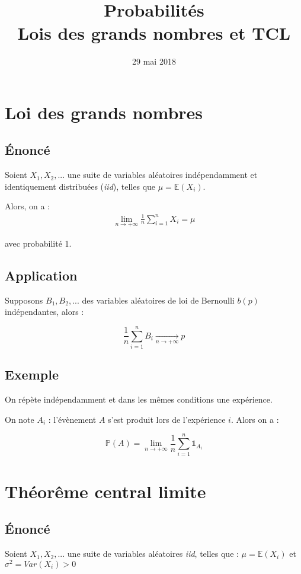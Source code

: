 \documentclass{article}
\title{%
  Probabilités \\
  \large Lois des grands nombres et TCL}
\date{29 mai 2018}
\begin{document}
\maketitle

\section{Loi des grands nombres}

\subsection{Énoncé}
Soient $X_1, X_2,...$ une suite de variables aléatoires indépendamment et
identiquement distribuées (\textit{iid}), telles que $\mu = \mathbb{E}(X_i)$.

Alors, on a :
\begin{align*}
  \lim_{n \to + \infty} \frac{1}{n} \sum_{i=1}^n X_i = \mu
\end{align*}

avec probabilité 1.

\subsection{Application}

Supposons $B_1,B_2,...$ des variables aléatoires de loi de Bernoulli $b(p)$
indépendantes, alors :

$$ \frac{1}{n} \sum_{i=1}^n B_i \xrightarrow[n \to + \infty]{} p $$

\subsection{Exemple}
On répète indépendamment et dans les mêmes conditions une expérience.

On note $A_i$ : l'évènement $A$ s'est produit lors de l'expérience $i$.
Alors on a :

$$ \mathbb{P}(A) = \lim_{n \to + \infty} \frac{1}{n} \sum_{i=1}^n \mathds{1}_{A_i} $$

\section{Théorême central limite}

\subsection{Énoncé}
Soient $X_1, X_2,...$ une suite de variables aléatoires \textit{iid}, telles
que :
$ \mu = \mathbb{E}(X_i) $ et $\sigma^2 = \textit{Var}(X_i) > 0 $
\end{document}
